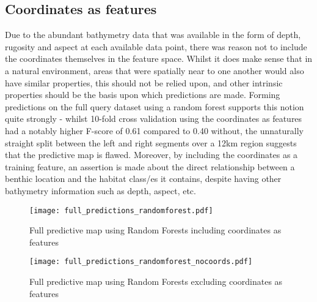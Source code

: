 \subsection{Coordinates as features}
Due to the abundant bathymetry data that was available in the form of depth, rugosity and aspect at each available data point, there was reason not to include the coordinates themselves in the feature space. Whilst it does make sense that in a natural environment, areas that were spatially near to one another would also have similar properties, this should not be relied upon, and other intrinsic properties should be the basis upon which predictions are made. Forming predictions on the full query dataset using a random forest supports this notion quite strongly - whilst 10-fold cross validation using the coordinates as features had a notably higher F-score of 0.61 compared to 0.40 without, the unnaturally straight split between the left and right segments over a 12km region suggests that the predictive map is flawed. Moreover, by including the coordinates as a training feature, an assertion is made about the direct relationship between a benthic location and the habitat class/es it contains, despite having other bathymetry information such as depth, aspect, etc. 


\begin{figure}[H]
    \begin{minipage}{.49\linewidth}
        \texttt{[image: full\_predictions\_randomforest.pdf]}
        \caption{Full predictive map using Random Forests including coordinates as features}
        \label{fig:rf_w_coords_preds}
    \end{minipage}
    \hfill
    \begin{minipage}{.49\linewidth}
        \texttt{[image: full\_predictions\_randomforest\_nocoords.pdf]}
        \caption{Full predictive map using Random Forests excluding coordinates as features}
        \label{fig:rf_wo_coords_preds}
    \end{minipage}
\end{figure}

